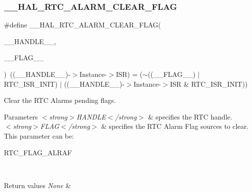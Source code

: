 \subsubsection{\texorpdfstring{\+\_\+\+\_\+\+H\+A\+L\+\_\+\+R\+T\+C\+\_\+\+A\+L\+A\+R\+M\+\_\+\+C\+L\+E\+A\+R\+\_\+\+F\+L\+AG}{\_\_HAL\_RTC\_ALARM\_CLEAR\_FLAG}}
{\footnotesize\ttfamily \#define \+\_\+\+\_\+\+H\+A\+L\+\_\+\+R\+T\+C\+\_\+\+A\+L\+A\+R\+M\+\_\+\+C\+L\+E\+A\+R\+\_\+\+F\+L\+AG(\begin{DoxyParamCaption}\item[{}]{\+\_\+\+\_\+\+H\+A\+N\+D\+L\+E\+\_\+\+\_\+,  }\item[{}]{\+\_\+\+\_\+\+F\+L\+A\+G\+\_\+\+\_\+ }\end{DoxyParamCaption})~((\+\_\+\+\_\+\+H\+A\+N\+D\+L\+E\+\_\+\+\_\+)-\/$>$Instance-\/$>$I\+SR) = ($\sim$((\+\_\+\+\_\+\+F\+L\+A\+G\+\_\+\+\_\+) $\vert$ R\+T\+C\+\_\+\+I\+S\+R\+\_\+\+I\+N\+IT) $\vert$ ((\+\_\+\+\_\+\+H\+A\+N\+D\+L\+E\+\_\+\+\_\+)-\/$>$Instance-\/$>$I\+SR \& R\+T\+C\+\_\+\+I\+S\+R\+\_\+\+I\+N\+IT))}



Clear the R\+TC Alarm\textquotesingle{}s pending flags. 


\begin{DoxyParams}{Parameters}
{\em $<$strong$>$\+H\+A\+N\+D\+L\+E$<$/strong$>$} & specifies the R\+TC handle. \\
\hline
{\em $<$strong$>$\+F\+L\+A\+G$<$/strong$>$} & specifies the R\+TC Alarm Flag sources to clear. This parameter can be\+: \begin{DoxyItemize}
\item R\+T\+C\+\_\+\+F\+L\+A\+G\+\_\+\+A\+L\+R\+AF \end{DoxyItemize}
\\
\hline
\end{DoxyParams}

\begin{DoxyRetVals}{Return values}
{\em None} & \\
\hline
\end{DoxyRetVals}
\mbox{\label{group___r_t_c___exported___macros_gadc2d6dc4a75136bdd2b67c1b35d04b10}} 
